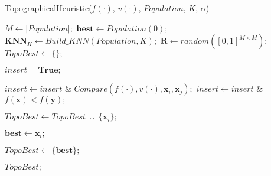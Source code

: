 \begin{breakablealgorithm}
\caption{TopographicalHeuristic($f(\cdot)$, $v(\cdot)$, $Population$, $K$, $\alpha$)}
\label{alg:TopographicalHeuristic}
\begin{spacing}{1.5}
\begin{algorithmic}[1]


\State $M \gets |Population|;$
\State $\bm{best} \gets Population(0);$
\State $\bm{KNN}_K \gets Build\_KNN(Population, K);$
\State $\bm{R} \gets random([0, 1]^{M \times M});$
\State $TopoBest \gets \{\};$


\State $insert = \bm{True};$

		\State $insert \gets insert$ \& $Compare(f(\cdot), v(\cdot), \bm{x}_i, \bm{x}_j);$
	\Else
		\State $insert \gets insert$ \& $f(\bm{x}) < f(\bm{y});$
	\EndIf
\EndFor

\State $TopoBest \gets TopoBest \ \cup \ \{\bm{x}_i\};$
\EndIf

\State $\bm{best} \gets \bm{x}_i;$
\EndIf
\EndFor

	\State $TopoBest \gets \{\bm{best}\};$
\EndIf

\State \Return $TopoBest;$



\end{algorithmic}
\end{spacing}
\end{breakablealgorithm}